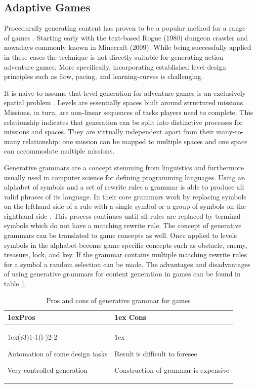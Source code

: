 \subsection{Adaptive Games} \label{sec:adaptive-games}
Procedurally generating content has proven to be a popular method for a range of games \cite{Dormans2011}.
Starting early with the text-based Rogue (1980) dungeon crawler and nowadays commonly known in Minecraft (2009).
While being successfully applied in these cases the technique is not directly suitable for generating action-adventure games.
More specifically, incorporating established level-design principles such as flow, pacing, and learning-curves is challenging.

It is naive to assume that level generation for adventure games is an exclusively spatial problem \cite{Dormans2011}.
Levels are essentially spaces built around structured missions.
Missions, in turn, are non-linear sequences of tasks players need to complete.
This relationship indicates that generation can be split into distinctive processes for missions and spaces.
They are virtually independent apart from their many-to-many relationship: one mission can be mapped to multiple spaces and one space can accommodate multiple missions.

Generative grammars are a concept stemming from linguistics and furthermore usually used in computer science for defining programming languages.
Using an alphabet of symbols and a set of rewrite rules a grammar is able to produce all valid phrases of its language.
In their core grammars work by replacing symbols on the lefthand side of a rule with a single symbol or a group of symbols on the righthand side \cite{Dormans2011}.
This process continues until all rules are replaced by terminal symbols which do not have a matching rewrite rule.
The concept of generative grammars can be translated to game concepts as well.
Once applied to levels symbols in the alphabet become game-specific concepts such as obstacle, enemy, treasure, lock, and key.
If the grammar contains multiple matching rewrite rules for a symbol a random selection can be made.
The advantages and disadvantages of using generative grammars for content generation in games can be found in table \ref{tab:grammar}.

\begin{table}
\begin{tabularx}{\linewidth}{>{\parskip1ex}X@{\kern4\tabcolsep}>{\parskip1ex}X}
\toprule
\hfil\bfseries Pros
&
\hfil\bfseries Cons
\\\cmidrule(r{3\tabcolsep}){1-1}\cmidrule(l{-\tabcolsep}){2-2}

Automation of some design tasks\par
Very controlled generation

&

Result is difficult to foresee\par
Construction of grammar is expensive

\\\bottomrule
\end{tabularx}
\caption{Pros and cons of generative grammar for games}
\label{tab:grammar}
\end{table}

